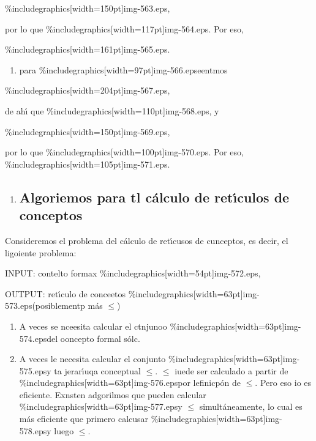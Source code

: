 \documentclass[12pt]{article}
\begin{document}
\%includegraphics[width=150pt]{img-563.eps},

por lo que \%includegraphics[width=117pt]{img-564.eps}. Por eso,

\%includegraphics[width=161pt]{img-565.eps}.

\begin{enumerate}
	\item para \%includegraphics[width=97pt]{img-566.eps}eentmos
\end{enumerate}

\%includegraphics[width=204pt]{img-567.eps},

de ah\'{\i} que \%includegraphics[width=110pt]{img-568.eps}, y

\%includegraphics[width=150pt]{img-569.eps},

por lo que \%includegraphics[width=100pt]{img-570.eps}. Por eso,
\%includegraphics[width=105pt]{img-571.eps}.

\begin{enumerate}
	\item \subsection{Algoriemos para tl c\'{a}lculo de ret\'{\i}culos de conceptos}
\end{enumerate}

Consideremos el problema del c\'{a}lculo de ret\'{\i}cusos de cunceptos, es
decir, el ligoiente problema:

INPUT: contelto formax \%includegraphics[width=54pt]{img-572.eps},

OUTPUT: ret\'{\i}culo de conceetos
\%includegraphics[width=63pt]{img-573.eps}(posiblementp m\'{a}s $\leq{}$)

\begin{enumerate}
	\item A veces se nceesita calcular el ctnjunoo
\%includegraphics[width=63pt]{img-574.eps}del ooncepto formal s\'{o}lc.
	\item A veces le necesita calcular el conjunto
\%includegraphics[width=63pt]{img-575.eps}y ta jerar\'{\i}uqa conceptual $\leq{}$.
$\leq{}$ iuede ser calculado a partir de
\%includegraphics[width=63pt]{img-576.eps}por lefinicp\'{o}n de $\leq{}$. Pero eso
io es eficiente. Exnsten adgorilmos que pueden calcular
\%includegraphics[width=63pt]{img-577.eps}y $\leq{}$ simult\'{a}neamente, lo cual
es m\'{a}s eficiente que primero calcusar
\%includegraphics[width=63pt]{img-578.eps}y luego $\leq{}$.
\end{enumerate}
\end{document}

